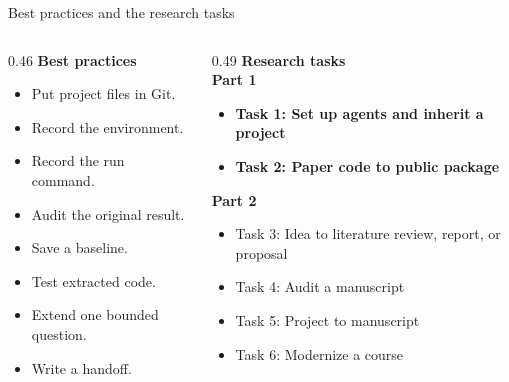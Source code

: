 \begin{frame}{Best practices and the research tasks}
  \vfill
  \begin{columns}[t]
    \begin{column}{0.46\textwidth}
      \textbf{Best practices}
      \begin{itemize}\setlength\itemsep{0.45em}
        \item Put project files in Git.
        \item Record the environment.
        \item Record the run command.
        \item Audit the original result.
        \item Save a baseline.
        \item Test extracted code.
        \item Extend one bounded question.
        \item Write a handoff.
      \end{itemize}
    \end{column}
    \begin{column}{0.49\textwidth}
      \textbf{Research tasks}\\[0.3em]
      {\small\color{NDGold!80!black}\textbf{Part 1}}
      \begin{itemize}\small\setlength\itemsep{0.35em}
        \item \textbf{Task 1: Set up agents and inherit a project}
        \item \textbf{Task 2: Paper code to public package}
      \end{itemize}
      {\small\color{NDGold!80!black}\textbf{Part 2}}
      \begin{itemize}\small\setlength\itemsep{0.35em}
        \item Task 3: Idea to literature review, report, or proposal
        \item Task 4: Audit a manuscript
        \item Task 5: Project to manuscript
        \item Task 6: Modernize a course
      \end{itemize}
    \end{column}
  \end{columns}
  \vfill
\end{frame}

